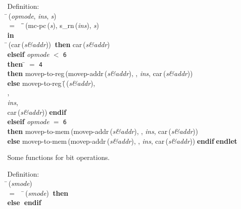 \begin{tabbing}{\sc Definition}: \\  
\=\,({\it{opmode\/}}, {\it{ins\/}}, {\it{s\/}}) \\ 
$=$$\;\;\;\;$\=\=\,({\rm{mc-pc}}\,({\it{s\/}}), {\rm{s\_rn}}\,({\it{ins\/}}), {\it{s\/}})\- \\ 
{\bf in} \\ 
\=\,({\rm{car}}\,({\it{s\&addr\/}}))$\;\;${\bf then }{\rm{car}}\,({\it{s\&addr\/}}) \\ 
{\bf elseif }{\it{opmode\/}} $<$ {\tt{6}} \\ 
{\bf then }\= $=$ {\tt{4}} \\ 
{\bf then }{\rm{movep-to-reg}}\,({\rm{movep-addr}}\,({\it{s\&addr\/}}), {}, {\it{ins\/}}, {\rm{car}}\,({\it{s\&addr\/}})) \\ 
{\bf else }{\rm{movep-to-reg}}\,(\=\,({\it{s\&addr\/}}), \\ 
{}, \\ 
{\it{ins\/}}, \\ 
{\rm{car}}\,({\it{s\&addr\/}}))\-$\;${\bf  endif}\- \\ 
{\bf elseif }{\it{opmode\/}} $=$ {\tt{6}} \\ 
{\bf then }{\rm{movep-to-mem}}\,({\rm{movep-addr}}\,({\it{s\&addr\/}}), {}, {\it{ins\/}}, {\rm{car}}\,({\it{s\&addr\/}})) \\ 
{\bf else }{\rm{movep-to-mem}}\,({\rm{movep-addr}}\,({\it{s\&addr\/}}), {}, {\it{ins\/}}, {\rm{car}}\,({\it{s\&addr\/}}))$\;${\bf  endif}\-$\;${\bf  endlet}\-\-
\end{tabbing}

 Some functions for bit operations.
\begin{tabbing}{\sc Definition}: \\  
\=\,({\it{smode\/}}) \\ 
$=$$\;\;\;\;$\=\,({\it{smode\/}})$\;\;${\bf then }{} \\ 
{\bf else }{}$\;${\bf  endif}\-\-
\end{tabbing}

